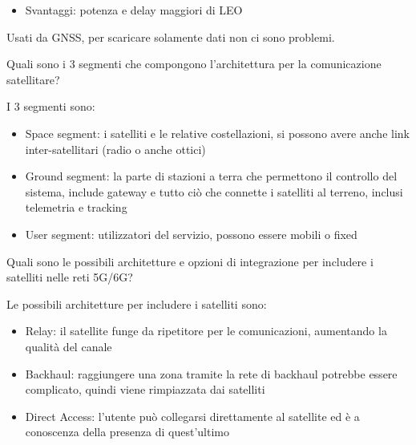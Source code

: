 \begin{questions}
\begin{solution}
\begin{itemize}
\begin{itemize}
                \item Svantaggi: potenza e delay maggiori di LEO
            \end{itemize}
            Usati da GNSS, per scaricare solamente dati non ci sono problemi.
        \end{itemize}
    \end{solution}
    
    \question Quali sono i 3 segmenti che compongono l'architettura per la comunicazione satellitare?
    
    \begin{solution}
        I 3 segmenti sono: 
        \begin{itemize}
            \item Space segment: i satelliti e le relative costellazioni, si possono avere anche link inter-satellitari (radio o anche ottici)
            
            \item Ground segment: la parte di stazioni a terra che permettono il controllo del sistema, include gateway e tutto ciò che connette i satelliti al terreno, inclusi telemetria e tracking
            
            \item User segment: utilizzatori del servizio, possono essere mobili o fixed
        \end{itemize}
    \end{solution}
    
    \question Quali sono le possibili architetture e opzioni di integrazione per includere i satelliti nelle reti 5G/6G?
    
    \begin{solution}
        Le possibili architetture per includere i satelliti sono: 
        \begin{itemize}
            \item Relay: il satellite funge da ripetitore per le comunicazioni, aumentando la qualità del canale
            
            \item Backhaul: raggiungere una zona tramite la rete di backhaul potrebbe essere complicato, quindi viene rimpiazzata dai satelliti
            
            \item Direct Access: l'utente può collegarsi direttamente al satellite ed è a conoscenza della presenza di quest'ultimo 
        \end{itemize}
        

\end{solution}
\end{questions}
